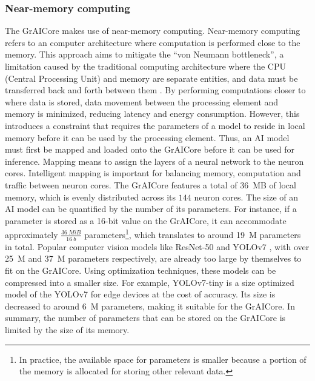 \subsubsection{Near-memory computing}
The GrAICore makes use of near-memory computing.
Near-memory computing refers to an computer architecture where computation is performed close to the memory.
This approach aims to mitigate the ``von Neumann bottleneck'', a limitation caused by the traditional computing architecture where the CPU (Central Processing Unit) and memory are separate entities, and data must be transferred back and forth between them \cite{indiveriMemoryInformationProcessing2015}.
By performing computations closer to where data is stored, data movement between the processing element and memory is minimized, reducing latency and energy consumption.
However, this introduces a constraint that requires the parameters of a model to reside in local memory before it can be used by the processing element.
Thus, an AI model must first be mapped and loaded onto the GrAICore before it can be used for inference.
Mapping means to assign the layers of a neural network to the neuron cores.
Intelligent mapping is important for balancing memory, computation and traffic between neuron cores.
The GrAICore features a total of \SI{36}{MB} of local memory, which is evenly distributed across its $144$ neuron cores.
The size of an AI model can be quantified by the number of its parameters.
For instance, if a parameter is stored as a 16-bit value on the GrAICore, it can accommodate approximately $\frac{\SI{36}{MiB}}{\SI{16}{b}}$ parameters\footnote{In practice, the available space for parameters is smaller because a portion of the memory is allocated for storing other relevant data.}, which translates to around \SI{19}{M} parameters in total.
Popular computer vision models like ResNet-50 \cite{heDeepResidualLearning2015} and YOLOv7 \cite{wangYOLOv7TrainableBagoffreebies2022}, with over \SI{25}{M} and \SI{37}{M} parameters respectively, are already too large by themselves to fit on the GrAICore.
Using optimization techniques, these models can be compressed into a smaller size.
For example, YOLOv7-tiny \cite{wangYOLOv7TrainableBagoffreebies2022} is a size optimized model of the YOLOv7 for edge devices at the cost of accuracy.
Its size is decreased to around \SI{6}{M} parameters, making it suitable for the GrAICore.
In summary, the number of parameters that can be stored on the GrAICore is limited by the size of its memory.

